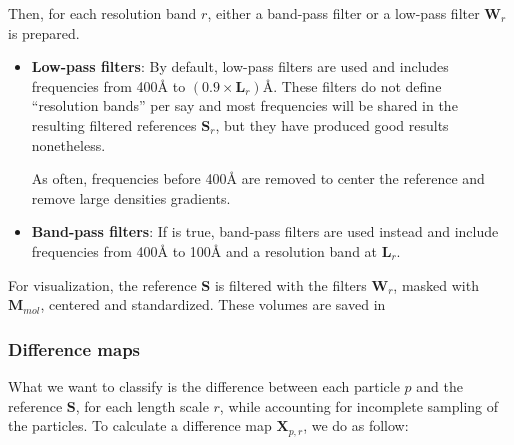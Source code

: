 
Then, for each resolution band $r$,  either a band-pass filter or a low-pass filter $\bm{W}_r$ is prepared.
\begin{itemize}
    \item \textbf{Low-pass filters}: By default, low-pass filters are used and includes frequencies from 400\r{A} to $(0.9 \times \bm{L}_{r})$\r{A}. These filters do not define ``resolution bands'' per say and most frequencies will be shared in the resulting filtered references $\bm{S}_r$, but they have produced good results nonetheless.
    \begin{note}As often, frequencies before 400\r{A} are removed to center the reference and remove large densities gradients.\end{note}
    
    \item \textbf{Band-pass filters}: If  is true, band-pass filters are used instead and include frequencies from 400\r{A} to 100\r{A} and a resolution band at $\bm{L}_r$.
\end{itemize}

For visualization, the reference $\bm{S}$ is filtered with the filters $\bm{W}_r$, masked with $\bm{M}_{mol}$, centered and standardized. These volumes are saved in 



\subsubsection{Difference maps}

What we want to classify is the difference between each particle $p$ and the reference $\bm{S}$, for each length scale $r$, while accounting for incomplete sampling of the particles. To calculate a difference map $\bm{X}_{p,r}$, we do as follow:

